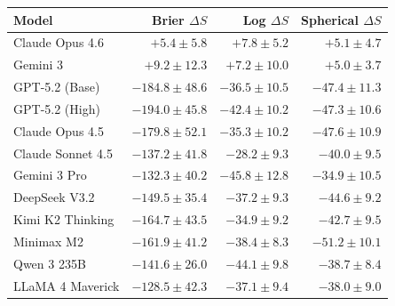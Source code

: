 \begin{tabular}{l *{3}{r}}
\toprule
\textbf{Model} & \textbf{Brier} $\Delta S$ & \textbf{Log} $\Delta S$ & \textbf{Spherical} $\Delta S$ \\
\midrule
Claude Opus 4.6    & $+5.4\pm5.8$ & $+7.8\pm5.2$ & $+5.1\pm4.7$ \\
Gemini 3           & $+9.2\pm12.3$ & $+7.2\pm10.0$ & $+5.0\pm3.7$ \\
GPT-5.2 (Base)     & $-184.8\pm48.6$ & $-36.5\pm10.5$ & $-47.4\pm11.3$ \\
GPT-5.2 (High)     & $-194.0\pm45.8$ & $-42.4\pm10.2$ & $-47.3\pm10.6$ \\
Claude Opus 4.5    & $-179.8\pm52.1$ & $-35.3\pm10.2$ & $-47.6\pm10.9$ \\
Claude Sonnet 4.5  & $-137.2\pm41.8$ & $-28.2\pm9.3$ & $-40.0\pm9.5$ \\
Gemini 3 Pro       & $-132.3\pm40.2$ & $-45.8\pm12.8$ & $-34.9\pm10.5$ \\
DeepSeek V3.2      & $-149.5\pm35.4$ & $-37.2\pm9.3$ & $-44.6\pm9.2$ \\
Kimi K2 Thinking   & $-164.7\pm43.5$ & $-34.9\pm9.2$ & $-42.7\pm9.5$ \\
Minimax M2         & $-161.9\pm41.2$ & $-38.4\pm8.3$ & $-51.2\pm10.1$ \\
Qwen 3 235B        & $-141.6\pm26.0$ & $-44.1\pm9.8$ & $-38.7\pm8.4$ \\
LLaMA 4 Maverick   & $-128.5\pm42.3$ & $-37.1\pm9.4$ & $-38.0\pm9.0$ \\
\bottomrule
\end{tabular}
